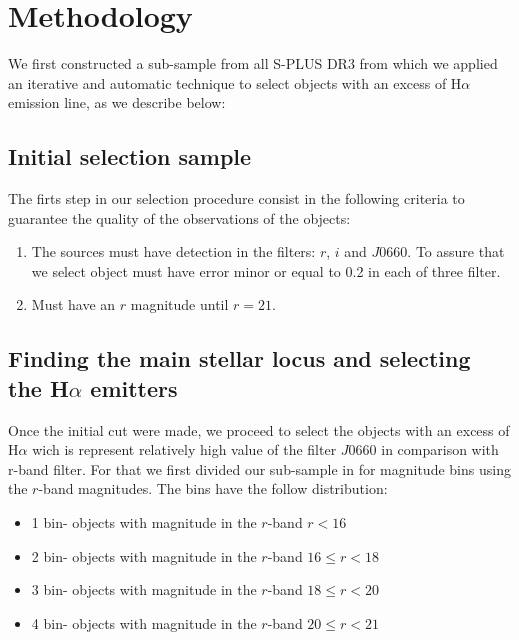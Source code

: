 \documentclass[fleqn,usenatbib]{mnras}
\begin{document}
\section{Methodology}
\label{sec:metho}

We first constructed a sub-sample from all S-PLUS DR3 from which we
applied an iterative and automatic technique to select objects with
an excess of H{$\alpha$} emission line,  as we describe below:

\subsection{Initial selection sample}
\label{sec:}

The firts step in our selection procedure consist in the following
criteria to guarantee the quality of the observations of the objects:

\begin{enumerate}
\item The sources must have detection in the filters: $r$, $i$ and
  $J$0660. To assure that we select object must have error minor or
  equal to 0.2 in each of three filter.

\item Must have an $r$ magnitude until $r = 21$.
  
\end{enumerate}

\subsection{Finding the main stellar locus and selecting the H{$\alpha$ emitters} }
\label{sec:}

Once the initial cut were made, we proceed to select the objects with
an excess of H{$\alpha$} wich is represent relatively high value of
the filter $J$0660 in comparison with r-band filter. For that we
first divided our sub-sample in for magnitude bins using the $r$-band
magnitudes. The bins have the follow distribution:

\begin{itemize}
\item 1 bin- objects with magnitude in the $r$-band $r < 16$
\item 2 bin- objects with magnitude in the $r$-band $16 \leq r < 18$
\item 3 bin- objects with magnitude in the $r$-band $18 \leq r < 20$
\item 4 bin- objects with magnitude in the $r$-band $20 \leq r < 21$
  
\end{itemize}
\end{document}
